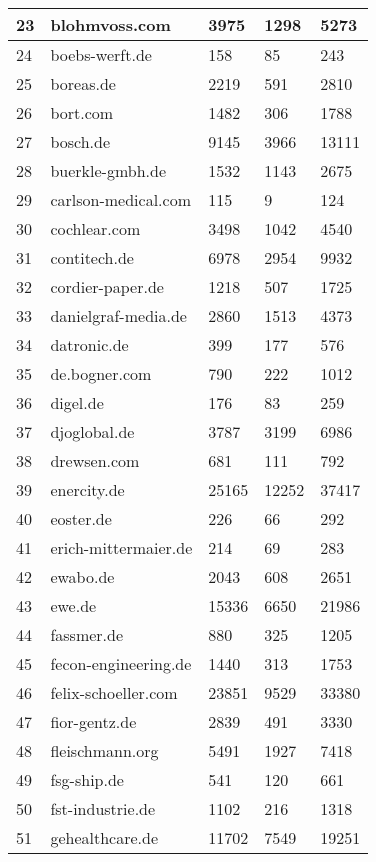 \begin{longtable}{|m{0.5cm}|m{6cm}|m{2cm}|m{2cm}|m{2cm}|}
	\hline
	23 & blohmvoss.com & 3975 & 1298 & 5273\\
	\hline
	24 & boebs-werft.de & 158 & 85 & 243\\
	\hline
	25 & boreas.de & 2219 & 591 & 2810\\
	\hline
	26 & bort.com & 1482 & 306 & 1788\\
	\hline
	27 & bosch.de & 9145 & 3966 & 13111\\
	\hline
	28 & buerkle-gmbh.de & 1532 & 1143 & 2675\\
	\hline
	29 & carlson-medical.com & 115 & 9 & 124\\
	\hline
	30 & cochlear.com & 3498 & 1042 & 4540\\
	\hline
	31 & contitech.de & 6978 & 2954 & 9932\\
	\hline
	32 & cordier-paper.de & 1218 & 507 & 1725\\
	\hline
	33 & danielgraf-media.de & 2860 & 1513 & 4373\\
	\hline
	34 & datronic.de & 399 & 177 & 576\\
	\hline
	35 & de.bogner.com & 790 & 222 & 1012\\
	\hline
	36 & digel.de & 176 & 83 & 259\\
	\hline
	37 & djoglobal.de & 3787 & 3199 & 6986\\
	\hline
	38 & drewsen.com & 681 & 111 & 792\\
	\hline
	39 & enercity.de & 25165 & 12252 & 37417\\
	\hline
	40 & eoster.de & 226 & 66 & 292\\
	\hline
	41 & erich-mittermaier.de & 214 & 69 & 283\\
	\hline
	42 & ewabo.de & 2043 & 608 & 2651\\
	\hline
	43 & ewe.de & 15336 & 6650 & 21986\\
	\hline
	44 & fassmer.de & 880 & 325 & 1205\\
	\hline
	45 & fecon-engineering.de & 1440 & 313 & 1753\\
	\hline
	46 & felix-schoeller.com & 23851 & 9529 & 33380\\
	\hline
	47 & fior-gentz.de & 2839 & 491 & 3330\\
	\hline
	48 & fleischmann.org & 5491 & 1927 & 7418\\
	\hline
	49 & fsg-ship.de & 541 & 120 & 661\\
	\hline
	50 & fst-industrie.de & 1102 & 216 & 1318\\
	\hline
	51 & gehealthcare.de & 11702 & 7549 & 19251\\

\end{longtable}
